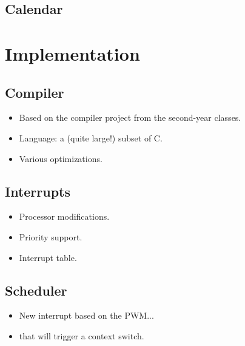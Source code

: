 \documentclass{beamer}
\begin{document}
    \subsection{Calendar}

  \section{Implementation}

    \subsection{Compiler}

    \begin{frame}
      \begin{itemize}
        \item Based on the compiler project from the second-year classes.
        \item Language: a (quite large!) subset of C.
        \item Various optimizations.
      \end{itemize}
    \end{frame}

    \subsection{Interrupts}

    \begin{frame}
      \begin{itemize}
        \item Processor modifications.
        \item Priority support.
        \item Interrupt table.
      \end{itemize}
    \end{frame}

    \subsection{Scheduler}

    \begin{frame}
      \begin{itemize}
        \item New interrupt based on the PWM...
        \item that will trigger a context switch.
      \end{itemize}
    \end{frame}
\end{document}
